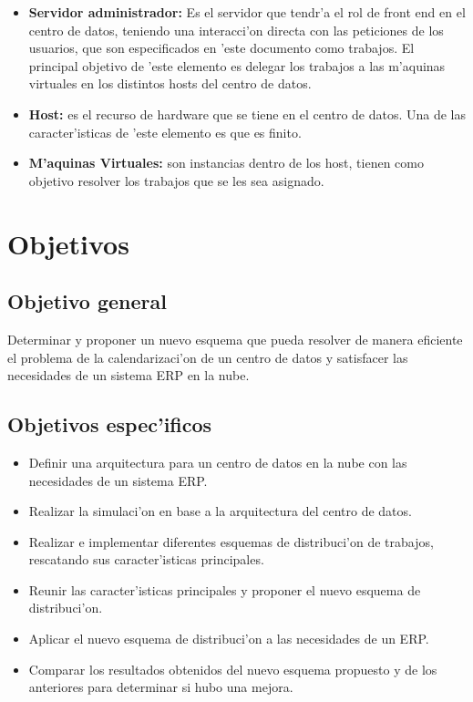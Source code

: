 \begin{itemize}
	\item \textbf{Servidor administrador:} Es el servidor que tendr'a el rol de front end en el centro de datos, teniendo una interacci'on directa con las peticiones de los usuarios, que son especificados en 'este documento como trabajos.
	El principal objetivo de 'este elemento es delegar los trabajos a las m'aquinas virtuales en los distintos hosts del centro de datos.
	\item \textbf{Host:} es el recurso de hardware que se tiene en el centro de datos. Una de las caracter'isticas de 'este elemento es que es finito.
	\item \textbf{M'aquinas Virtuales:} son instancias dentro de los host, tienen como objetivo resolver los trabajos que se les sea asignado.
\end{itemize}


\section*{Objetivos}


\subsection*{Objetivo general}


Determinar y proponer un nuevo esquema que pueda resolver de manera eficiente el problema de la calendarizaci'on de un centro de datos y satisfacer las necesidades de un sistema ERP en la nube.


\subsection*{Objetivos espec'ificos}


\begin{itemize}
	\item Definir una arquitectura para un centro de datos en la nube con las necesidades de un sistema ERP.
	\item Realizar la simulaci'on en base a la arquitectura del centro de datos.
	\item Realizar e implementar diferentes esquemas de distribuci'on de trabajos, rescatando sus caracter'isticas principales.
	\item Reunir las caracter'isticas principales y proponer el nuevo esquema de distribuci'on.
	\item Aplicar el nuevo esquema de distribuci'on a las necesidades de un ERP.
	\item Comparar los resultados obtenidos del nuevo esquema propuesto y de los anteriores para determinar si hubo una mejora.
\end{itemize}


